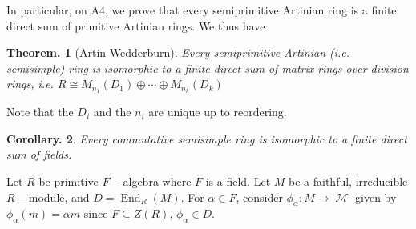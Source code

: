 \documentclass[11pt, a4paper]{memoir}
\theoremstyle{change}
\newtheorem{theorem}{Theorem.}[section]
\newtheorem{corollary}[theorem]{Corollary.}
\theoremstyle{plain}
\theoremstyle{nonumberplain}
\DeclareMathOperator{\End}{End}
\DeclareMathOperator{\M}{{\mathcal{M}}}
\numberwithin{equation}{section}
\begin{document}
In particular, on A4, we prove that every semiprimitive Artinian ring is a finite direct sum of primitive Artinian rings.
We thus have
\begin{theorem}[Artin-Wedderburn]
    Every semiprimitive Artinian (i.e. semisimple) ring is isomorphic to a finite direct sum of matrix rings over division rings, i.e. $R\cong M_{n_1}(D_1)\oplus\cdots\oplus M_{n_k}(D_k)$
\end{theorem}
Note that the $D_i$ and the $n_i$ are unique up to reordering.
\begin{corollary}
    Every commutative semisimple ring is isomorphic to a finite direct sum of fields.
\end{corollary}
Let $R$ be primitive $F-$algebra where $F$ is a field.
Let $M$ be a faithful, irreducible $R-$module, and $D=\End_R(M)$.
For $\alpha\in F$, consider $\phi_\alpha:M\to\M$ given by $\phi_\alpha(m)=\alpha m$ since $F\subseteq Z(R)$, $\phi_\alpha\in D$.
\end{document}
